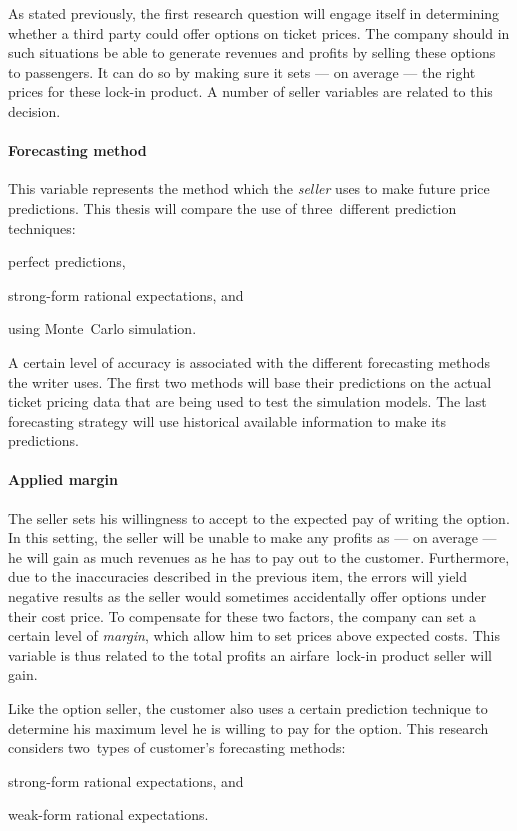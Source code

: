 As stated previously, the first research question will engage itself in determining whether a third party could offer options on ticket prices. The company should in such situations be able to generate revenues and profits by selling these options to passengers. It can do so by making sure it sets --- on average --- the right prices for these lock-in product. A number of seller variables are related to this decision.

\paragraph{Forecasting method} This variable represents the method which the \emph{seller} uses to make future price predictions. This thesis will compare the use of three~different prediction techniques:
\begin{compactitem}
    \item perfect predictions,
    \item strong-form rational expectations, and
    \item using Monte~Carlo simulation.
\end{compactitem}

A certain level of accuracy is associated with the different forecasting methods the writer uses. The first two methods will base their predictions on the actual ticket pricing data that are being used to test the simulation models. The last forecasting strategy will use historical available information to make its predictions.

\paragraph{Applied margin} The seller sets his willingness to accept to the expected pay of writing the option. In this setting, the seller will be unable to make any profits as --- on average --- he will gain as much revenues as he has to pay out to the customer. Furthermore, due to the inaccuracies described in the previous item, the errors will yield negative results as the seller would sometimes accidentally offer options under their cost price. To compensate for these two factors, the company can set a certain level of \emph{margin}, which allow him to set prices above expected costs. This variable is thus related to the total profits an airfare~lock-in product seller will gain.


Like the option seller, the customer also uses a certain prediction technique to determine his maximum level he is willing to pay for the option. This research considers two~types of customer's forecasting methods:
\begin{compactitem}
    \item strong-form rational expectations, and
    \item weak-form rational expectations.
\end{compactitem}

